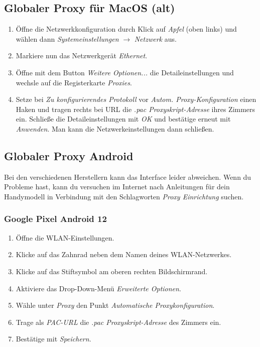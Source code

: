 \documentclass[a4paper,12pt]{scrartcl}
\begin{document}
\subsection*{Globaler Proxy für MacOS (alt)}
\begin{enumerate}
	 \item Öffne die Netzwerkkonfiguration durch Klick auf \textit{Apfel} (oben links) und wählen dann \textit{Systemeinstellungen} $\rightarrow$ \textit{Netzwerk} aus.
	\item Markiere nun das Netzwerkgerät \textit{Ethernet}.
	\item Öffne mit dem Button \textit{Weitere Optionen...} die Detaileinstellungen und wechsle auf die Registerkarte \textit{Proxies}.
	\item Setze bei \textit{Zu konfigurierendes Protokoll} vor \textit{Autom. Proxy-Konfiguration} einen Haken und tragen rechts bei URL die \textit{.pac Proxyskript-Adresse} ihres Zimmers ein. Schließe die Detaileinstellungen mit \textit{OK} und bestätige erneut mit \textit{Anwenden}. Man kann die Netzwerkeinstellungen dann schließen.
\end{enumerate}

\subsection*{Globaler Proxy Android}
Bei den verschiedenen Herstellern kann das Interface leider abweichen.
Wenn du Probleme hast, kann du versuchen im Internet nach Anleitungen für dein Handymodell in Verbindung mit den Schlagworten \textit{Proxy Einrichtung} suchen.

\subsubsection*{Google Pixel Android 12}
\begin{enumerate}
	\item Öffne die WLAN-Einstellungen.
	\item Klicke auf das Zahnrad neben dem Namen deines WLAN-Netzwerkes.
	\item Klicke auf das Stiftsymbol am oberen rechten Bildschirmrand.
	\item Aktiviere das Drop-Down-Menü \textit{Erweiterte Optionen}.
	\item Wähle unter \textit{Proxy} den Punkt \textit{Automatische Proxykonfiguration}.
	\item Trage als \textit{PAC-URL} die \textit{.pac Proxyskript-Adresse} des Zimmers ein.
	\item Bestätige mit \textit{Speichern}.
\end{enumerate}
\end{document}
